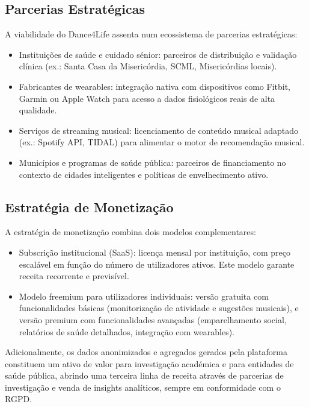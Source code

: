 \documentclass[runningheads]{llncs}
\begin{document}
\subsection{Parcerias Estratégicas}
A viabilidade do Dance4Life assenta num ecossistema de parcerias estratégicas:
\begin{itemize}
\item Instituições de saúde e cuidado sénior: parceiros de distribuição e validação clínica (ex.: Santa Casa da Misericórdia, SCML, Misericórdias locais).
\item Fabricantes de wearables: integração nativa com dispositivos como Fitbit, Garmin ou Apple Watch para acesso a dados fisiológicos reais de alta qualidade.
\item Serviços de streaming musical: licenciamento de conteúdo musical adaptado (ex.: Spotify API, TIDAL) para alimentar o motor de recomendação musical.
\item Municípios e programas de saúde pública: parceiros de financiamento no contexto de cidades inteligentes e políticas de envelhecimento ativo.
\end{itemize}

\subsection{Estratégia de Monetização}
A estratégia de monetização combina dois modelos complementares:
\begin{itemize}
\item Subscrição institucional (SaaS): licença mensal por instituição, com preço escalável em função do número de utilizadores ativos. Este modelo garante receita recorrente e previsível.
\item Modelo freemium para utilizadores individuais: versão gratuita com funcionalidades básicas (monitorização de atividade e sugestões musicais), e versão premium com funcionalidades avançadas (emparelhamento social, relatórios de saúde detalhados, integração com wearables).
\end{itemize}

Adicionalmente, os dados anonimizados e agregados gerados pela plataforma constituem um ativo de valor para investigação académica e para entidades de saúde pública, abrindo uma terceira linha de receita através de parcerias de investigação e venda de insights analíticos, sempre em conformidade com o RGPD.
\end{document}
